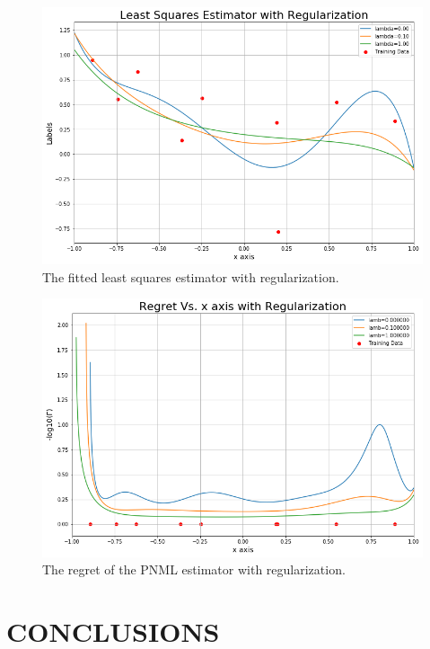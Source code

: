 \documentclass[letterpaper, 10 pt, conference]{ieeeconf}  %
\begin{document}
\begin{figure}[h] 
    \centering\includegraphics[width=\linewidth]{least_squares_with_reg_plot.png}
    \caption{The fitted least squares estimator with regularization.}
    \label{fig:least_squares_with_reg}
\end{figure}

\begin{figure}[h]
    \centering\includegraphics[width=\linewidth]{regret_with_reg_plot.png}
    \caption{The regret of the PNML estimator with regularization.}
    \label{fig:regret_with_reg}
\end{figure}


\section{CONCLUSIONS} \label{sec:Conclusion}
\end{document}
